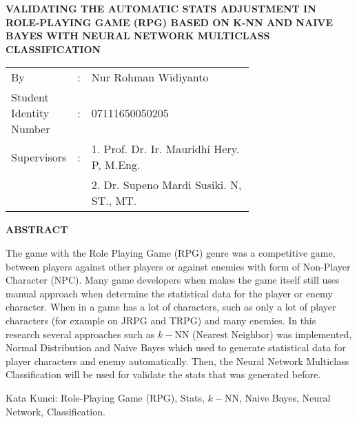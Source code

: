 \begin{spacing}{1}
	\begin{center}
		\large\textbf{VALIDATING THE AUTOMATIC STATS ADJUSTMENT IN ROLE-PLAYING GAME (RPG) BASED ON K-NN AND NAIVE BAYES WITH NEURAL NETWORK MULTICLASS CLASSIFICATION}
	\end{center}
	\vspace{2ex}
	
	\begin{adjustwidth}{-0.2cm}{}
		\begin{tabular}{lcp{0.7\linewidth}}
			By &:& Nur Rohman Widiyanto \\
			Student Identity Number &:&	07111650050205 \\
			Supervisors &:& 1. Prof. Dr. Ir. Mauridhi Hery. P, M.Eng. \\
			& & 2. Dr. Supeno Mardi Susiki. N, ST., MT. \\
		\end{tabular}
	\end{adjustwidth}
	\vspace{2ex}
	
	\begin{center}
		\large\textbf{ABSTRACT}
	\end{center}
	\vspace{1ex}
	
	The game with the Role Playing Game (RPG) genre was a competitive game, between players against other players or against enemies with form of Non-Player Character (NPC). Many game developers when makes the game itself still uses manual approach when determine the statistical data for the player or enemy character. When in a game has a lot of characters, such as only a lot of player characters (for example on JRPG and TRPG) and many enemies. In this research several approaches such as $k-$NN (Nearest Neighbor) was implemented, Normal Distribution and Naive Bayes which used to generate statistical data for player characters and enemy automatically. Then, the Neural Network Multiclass Classification will be used for validate the stats that was generated before.
	\vspace{2ex}

	Kata Kunci: Role-Playing Game (RPG), Stats, $k-$NN, Naive Bayes, Neural Network, Classification.
\end{spacing}